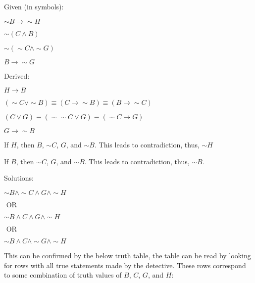 \documentclass{article}
\newenvironment{Solution}
{\noindent\color{red}}
{\newline}
\begin{document}
\begin{Solution}
    Given (in symbols):
    \begin{adjustwidth}{2em}{0em}
        $\sim B \rightarrow \sim H$

        $\sim (C \land B)$

        $\sim (\sim C \land \sim G)$

        $B \rightarrow \sim G$
    \end{adjustwidth}

    \phantom{ }

    Derived:

    \begin{adjustwidth}{2em}{0em}
        $H \rightarrow B$

        $(\sim C \lor \sim B) \equiv (C \rightarrow \sim B) \equiv (B \rightarrow \sim C)$

        $(C \lor G) \equiv (\sim \sim C \lor G) \equiv (\sim C \rightarrow G)$

        $G \rightarrow \sim B$
    \end{adjustwidth}

    If $H$, then $B$, $\sim C$, $G$, and $\sim B$.
    This leads to contradiction, thus, $\sim H$

    If $B$, then $\sim C$, $G$, and $\sim B$.
    This leads to contradiction, thus, $\sim B$.

    \phantom{ }

    Solutions:

    \begin{adjustwidth}{2em}{0em}
        $\sim B \land \sim C \land G \land \sim H$

        \hspace*{3.75em}$\text{ OR }$

        $\sim B \land C \land G \land \sim H$

        \hspace*{3.75em}$\text{ OR }$

        $\sim B \land C \land \sim G \land \sim H$
    \end{adjustwidth}

    This can be confirmed by the below truth table, the table
    can be read by looking for rows with all true statements
    made by the detective. These rows correspond to some combination
    of truth values of $B$, $C$, $G$, and $H$:


\end{Solution}
\end{document}
